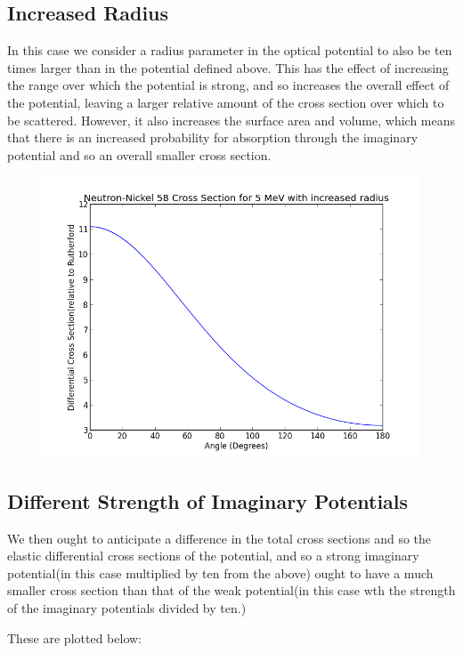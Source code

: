 \documentclass[paper=a4, fontsize=11pt]{scrartcl} %
\numberwithin{equation}{section} %
\numberwithin{figure}{section} %
\numberwithin{table}{section} %
\begin{document}
\subsection{Increased Radius}

In this case we consider a radius parameter in the optical potential to also be ten times larger than in the potential defined above. This has the effect of increasing the range over which the potential is strong, and so increases the overall effect of the potential, leaving a larger relative amount of the cross section over which to be scattered. However, it also increases the surface area and volume, which means that there is an increased probability for absorption through the imaginary potential and so an overall smaller cross section.

\begin{figure}[hbt]
\centering
\includegraphics[width=.4\textwidth]{NeutronRad.png}
\end{figure}

\subsection{Different Strength of Imaginary Potentials}

We then ought to anticipate a difference in the total cross sections and so the elastic differential cross sections of the potential, and so a strong imaginary potential(in this case multiplied by ten from the above) ought to have a much smaller cross section than that of the weak potential(in this case wth the strength of the imaginary potentials divided by ten.)

These are plotted below:
\end{document}
